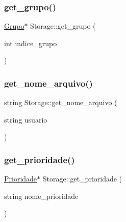 \subsubsection{\texorpdfstring{get\+\_\+grupo()}{get\_grupo()}\hspace{0.1cm}{\footnotesize\ttfamily [2/2]}}
{\footnotesize\ttfamily \hyperlink{classGrupo}{Grupo}$\ast$ Storage\+::get\+\_\+grupo (\begin{DoxyParamCaption}\item[{int}]{indice\+\_\+grupo }\end{DoxyParamCaption})}

\mbox{\label{classStorage_a72004c148e48fdd5fde71db2319762e9}} 
\subsubsection{\texorpdfstring{get\+\_\+nome\+\_\+arquivo()}{get\_nome\_arquivo()}}
{\footnotesize\ttfamily string Storage\+::get\+\_\+nome\+\_\+arquivo (\begin{DoxyParamCaption}\item[{string}]{usuario }\end{DoxyParamCaption})}

\mbox{\label{classStorage_aeb09b13da8b70a5bc279197d7298de06}} 
\subsubsection{\texorpdfstring{get\+\_\+prioridade()}{get\_prioridade()}\hspace{0.1cm}{\footnotesize\ttfamily [1/2]}}
{\footnotesize\ttfamily \hyperlink{classPrioridade}{Prioridade}$\ast$ Storage\+::get\+\_\+prioridade (\begin{DoxyParamCaption}\item[{string}]{nome\+\_\+prioridade }\end{DoxyParamCaption})}

\mbox{\label{classStorage_abc3618c3a0b69ffe6e895cd701b0516e}} 
